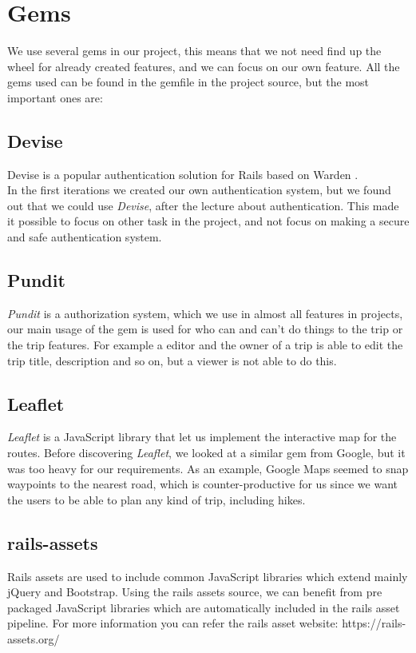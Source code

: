 \documentclass[a4paper]{article}
\begin{document}
\section{Gems}
We use several gems in our project, this means that we not need find up the wheel for already created features, and we can focus on our own feature. All the gems used can be found in the gemfile in the project source, but the most important ones are:
\subsection{Devise}
Devise is a popular authentication solution for Rails based on Warden \cite{devise}. \\
In the first iterations we created our own authentication system, but we found out that we could use \textit{Devise}, after the lecture about authentication. This made it possible to focus on other task in the project, and not focus on making a secure and safe authentication system. 

\subsection{Pundit}
\textit{Pundit} is a authorization system\cite{pundit}, which we use in almost all features in projects, our main usage of the gem is used for who can and can't do things to the trip or the trip features. For example a editor and the owner of a trip is able to edit the trip title, description and so on, but a viewer is not able to do this. 

\subsection{Leaflet}
\textit{Leaflet}\cite{leaflet} is a JavaScript library that let us implement the interactive map for the routes. Before discovering \textit{Leaflet}, we looked at a similar gem from Google, but it was too heavy for our requirements. As an example, Google Maps seemed to snap waypoints to the nearest road, which is counter-productive for us since we want the users to be able to plan any kind of trip, including hikes.

\subsection{rails-assets}
Rails assets are used to include common JavaScript libraries which extend mainly jQuery and Bootstrap. Using the rails assets source, we can benefit from pre packaged JavaScript libraries which are automatically included in the rails asset pipeline. For more information you can refer the rails asset website: https://rails-assets.org/
\end{document}
